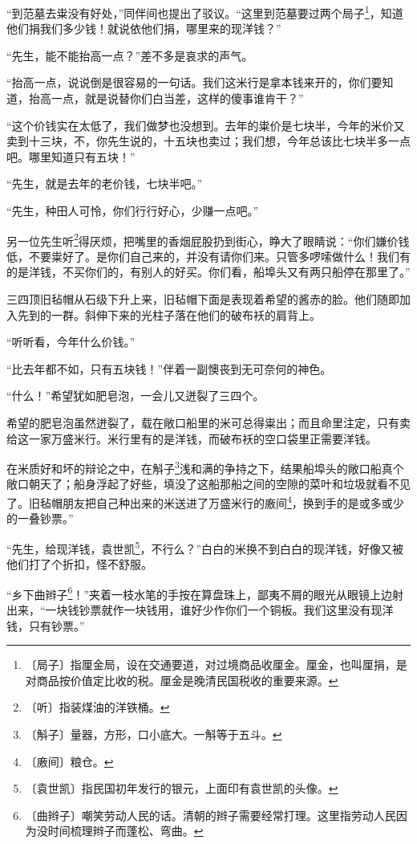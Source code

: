 \documentclass[12pt,UTF-8,openany]{ctexbook}
\begin{document}
\begin{large}
    “到范墓去粜没有好处，”同伴间也提出了驳议。“这里到范墓要过两个局子\footnote{〔局子〕指厘金局，设在交通要道，对过境商品收厘金。厘金，也叫厘捐，是对商品按价值定比收的税。厘金是晚清民国税收的重要来源。}，知道他们捐我们多少钱！就说依他们捐，哪里来的现洋钱？”
    
    “先生，能不能抬高一点？”差不多是哀求的声气。
    
    “抬高一点，说说倒是很容易的一句话。我们这米行是拿本钱来开的，你们要知道，抬高一点，就是说替你们白当差，这样的傻事谁肯干？”
    
    “这个价钱实在太低了，我们做梦也没想到。去年的粜价是七块半，今年的米价又卖到十三块，不，你先生说的，十五块也卖过；我们想，今年总该比七块半多一点吧。哪里知道只有五块！”
    
    “先生，就是去年的老价钱，七块半吧。”
    
    “先生，种田人可怜，你们行行好心，少赚一点吧。”
    
    另一位先生听\footnote{〔听〕指装煤油的洋铁桶。}得厌烦，把嘴里的香烟屁股扔到街心，睁大了眼睛说：“你们嫌价钱低，不要粜好了。是你们自己来的，并没有请你们来。只管多啰嗦做什么！我们有的是洋钱，不买你们的，有别人的好买。你们看，船埠头又有两只船停在那里了。”
    
    三四顶旧毡帽从石级下升上来，旧毡帽下面是表现着希望的酱赤的脸。他们随即加入先到的一群。斜伸下来的光柱子落在他们的破布袄的肩背上。
    
    “听听看，今年什么价钱。”
    
    “比去年都不如，只有五块钱！”伴着一副懊丧到无可奈何的神色。
    
    “什么！”希望犹如肥皂泡，一会儿又迸裂了三四个。
    
    希望的肥皂泡虽然迸裂了，载在敞口船里的米可总得粜出；而且命里注定，只有卖给这一家万盛米行。米行里有的是洋钱，而破布袄的空口袋里正需要洋钱。
    
    在米质好和坏的辩论之中，在斛子\footnote{〔斛子〕量器，方形，口小底大。一斛等于五斗。}浅和满的争持之下，结果船埠头的敞口船真个敞口朝天了；船身浮起了好些，填没了这船那船之间的空隙的菜叶和垃圾就看不见了。旧毡帽朋友把自己种出来的米送进了万盛米行的廒间\footnote{〔廒间〕粮仓。}，换到手的是或多或少的一叠钞票。”
    
    “先生，给现洋钱，袁世凯\footnote{〔袁世凯〕指民国初年发行的银元，上面印有袁世凯的头像。}，不行么？”白白的米换不到白白的现洋钱，好像又被他们打了个折扣，怪不舒服。
    
    “乡下曲辫子\footnote{〔曲辫子〕嘲笑劳动人民的话。清朝的辫子需要经常打理。这里指劳动人民因为没时间梳理辫子而蓬松、弯曲。}！”夹着一枝水笔的手按在算盘珠上，鄙夷不屑的眼光从眼镜上边射出来，“一块钱钞票就作一块钱用，谁好少作你们一个铜板。我们这里没有现洋钱，只有钞票。”
    

\end{large}
\end{document}
